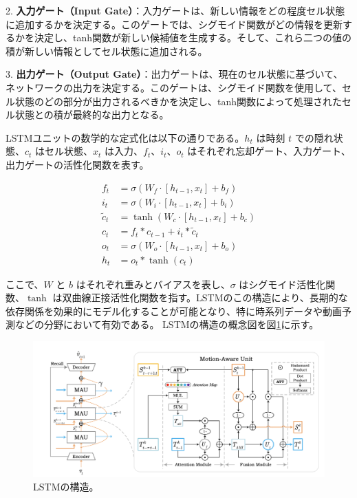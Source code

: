     2. \textbf{入力ゲート（Input Gate）}：入力ゲートは、新しい情報をどの程度セル状態に追加するかを決定する。このゲートでは、シグモイド関数がどの情報を更新するかを決定し、tanh関数が新しい候補値を生成する。そして、これら二つの値の積が新しい情報としてセル状態に追加される。
    
    3. \textbf{出力ゲート（Output Gate）}：出力ゲートは、現在のセル状態に基づいて、ネットワークの出力を決定する。このゲートは、シグモイド関数を使用して、セル状態のどの部分が出力されるべきかを決定し、tanh関数によって処理されたセル状態との積が最終的な出力となる。
    
    LSTMユニットの数学的な定式化は以下の通りである。\( h_t \) は時刻 \( t \) での隠れ状態、\( c_t \) はセル状態、\( x_t \) は入力、\( f_t \)、\( i_t \)、\( o_t \) はそれぞれ忘却ゲート、入力ゲート、出力ゲートの活性化関数を表す。
    
    \begin{align}
      f_t &= \sigma(W_f \cdot [h_{t-1}, x_t] + b_f) \\
      i_t &= \sigma(W_i \cdot [h_{t-1}, x_t] + b_i) \\
      \tilde{c}_t &= \tanh(W_c \cdot [h_{t-1}, x_t] + b_c) \\
      c_t &= f_t * c_{t-1} + i_t * \tilde{c}_t \\
      o_t &= \sigma(W_o \cdot [h_{t-1}, x_t] + b_o) \\
      h_t &= o_t * \tanh(c_t)
    \end{align}
    
    ここで、\( W \) と \( b \) はそれぞれ重みとバイアスを表し、\( \sigma \) はシグモイド活性化関数、\( \tanh \) は双曲線正接活性化関数を指す。LSTMのこの構造により、長期的な依存関係を効果的にモデル化することが可能となり、特に時系列データや動画予測などの分野において有効である。
    LSTMの構造の概念図を図\ref{fig:lstm}に示す。
    \begin{figure}[h]
      \centering
      \includegraphics[width=\textwidth]{figures/mau.png}
      \caption{LSTMの構造。}
      \label{fig:lstm}
    \end{figure}
    
